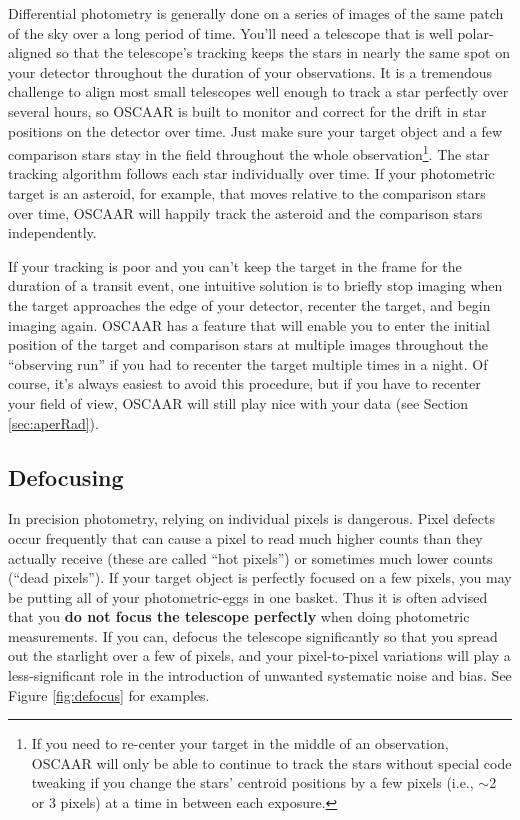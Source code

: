 \documentclass[a4paper]{article}
\begin{document}
Differential photometry is generally done on a series of images of the same patch of the sky over a long period of time. You'll need a telescope that is well polar-aligned so that the telescope's tracking keeps the stars in nearly the same spot on your detector throughout the duration of your observations. It is a tremendous challenge to align most small telescopes well enough to track a star perfectly over several hours, so OSCAAR is built to monitor and correct for the drift in star positions on the detector over time. Just make sure your target object and a few comparison stars stay in the field throughout the whole observation\footnote{If you need to re-center your target in the middle of an observation, OSCAAR will only be able to continue to track the stars without special code tweaking if you change the stars' centroid positions by a few pixels (i.e., $\sim$2 or 3 pixels) at a time in between each exposure.}. The star tracking algorithm follows each star individually over time. If your photometric target is an asteroid, for example, that moves relative to the comparison stars over time, OSCAAR will happily track the asteroid and the comparison stars independently. 

If your tracking is poor and you can't keep the target in the frame for the duration of a transit event, one intuitive solution is to briefly stop imaging when the target approaches the edge of your detector, recenter the target, and begin imaging again. OSCAAR has a feature that will enable you to enter the initial position of the target and comparison stars at multiple images throughout the ``observing run'' if you had to recenter the target multiple times in a night. Of course, it's always easiest to avoid this procedure, but if you have to recenter your field of view, OSCAAR will still play nice with your data (see Section \ref{sec:aperRad}).

\subsection{Defocusing} \label{sec:defocusing}

In precision photometry, relying on individual pixels is dangerous. Pixel defects occur frequently that can cause a pixel to read much higher counts than they actually receive (these are called ``hot pixels'') or sometimes much lower counts (``dead pixels''). If your target object is perfectly focused on a few pixels, you may be putting all of your photometric-eggs in one basket. Thus it is often advised that you \textbf{do not focus the telescope perfectly} when doing photometric measurements. If you can, defocus the telescope significantly so that you spread out the starlight over a few of pixels, and your pixel-to-pixel variations will play a less-significant role in the introduction of unwanted systematic noise and bias. See Figure \ref{fig:defocus} for examples.
\end{document}
